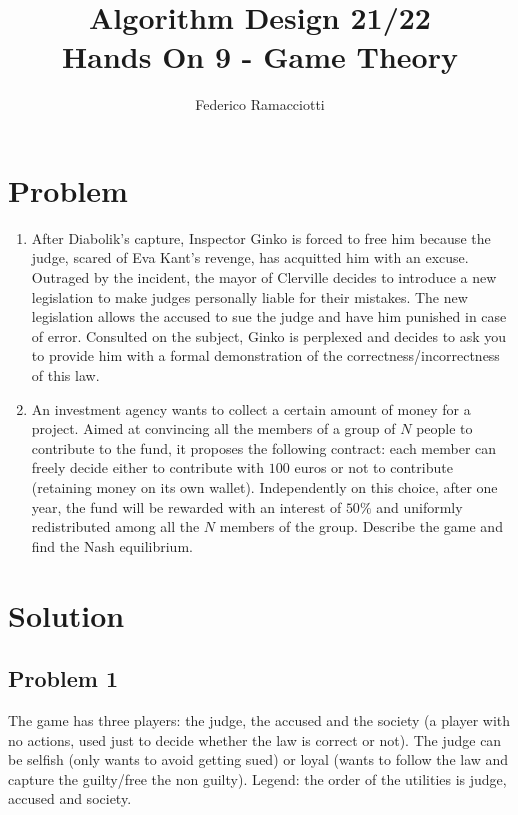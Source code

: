 \documentclass{article}
\title{\LARGE{\textbf{Algorithm Design 21/22}}\\ \vspace{1cm} Hands On 9 - Game Theory}
\author{Federico Ramacciotti}
\date{}
\begin{document}
\maketitle

\section{Problem}
\begin{enumerate}
    \item After Diabolik's capture, Inspector Ginko is forced to free him because the judge, scared of Eva Kant's revenge, has acquitted him with an excuse. Outraged by the incident, the mayor of Clerville decides to introduce a new legislation to make judges personally liable for their mistakes. The new legislation allows the accused to sue the judge and have him punished in case of error. Consulted on the subject, Ginko is perplexed and decides to ask you to provide him with a formal demonstration of the correctness/incorrectness of this law.
    \item An investment agency wants to collect a certain amount of money for a project. Aimed at convincing all the members of a group of $N$ people to contribute to the fund, it proposes the following contract: each member can freely decide either to contribute with $100$ euros or not to contribute (retaining money on its own wallet). Independently on this choice, after one year, the fund will be rewarded with an interest of $50\%$ and uniformly redistributed among all the $N$ members of the group. Describe the game and find the Nash equilibrium.
\end{enumerate}

\section{Solution}
\subsection{Problem 1}
The game has three players: the judge, the accused and the society (a player with no actions, used just to decide whether the law is correct or not).
The judge can be selfish (only wants to avoid getting sued) or loyal (wants to follow the law and capture the guilty/free the non guilty).
Legend: the order of the utilities is judge, accused and society.
\end{document}
